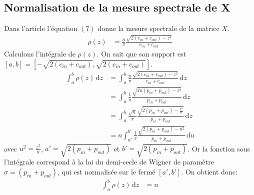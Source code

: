 \subsection{Normalisation de la mesure spectrale de X}
Dans l'article l'équation $(7)$ donne la mesure spectrale de la matrice $X$.
\begin{align*}
	\rho(z) &= \frac{n}{\pi} \frac{\sqrt{2(c_{in} + c_{out}) - z^2}}{c_{in} + c_{out}}
\end{align*}
Calculons l'intégrale de $\rho(z)$. 
On sait que son support est $[a, b] = [-\sqrt{2(c_{in} + c_{out})},\sqrt{2(c_{in} + c_{out})}]$.
\begin{align*}
	\int_{a}^{b} \rho(z) \, \mathrm{d}z &= \int_{a}^{b} \frac{n}{\pi} \frac{\sqrt{2(c_{in} + c_{out}) - z^2}}{c_{in} + c_{out}}  \, \mathrm{d}z \\
	&= \int_{a}^{b} \frac{1}{\pi} \frac{\sqrt{2 n (p_{in} + p_{out}) - z^2}}{p_{in} + p_{out}}  \, \mathrm{d}z \\
	&= \int_{a}^{b} \frac{\sqrt{n}}{\pi} \frac{\sqrt{2 (p_{in} + p_{out}) - \frac{z^2}{n}}}{p_{in} + p_{out}}  \, \mathrm{d}z  \\
	&= n \int_{a'}^{b'} \frac{1}{\pi} \frac{\sqrt{2 (p_{in} + p_{out}) - u^2}}{p_{in} + p_{out}}  \, \mathrm{d}u  
\end{align*}
avec $u^2 = \frac{z^2}{n}$, $a'= \sqrt{2(p_{in} + p_{out})}$ et $b'= \sqrt{2(p_{in} + p_{out})}$.
Or la fonction sous l’intégrale correspond à la loi du demi-cecle de Wigner de paramètre $\sigma = (p_{in} + p_{out})$, qui est normalisée sur le fermé $[a', b']$.
On obtient donc:
\begin{align*}
 	\int_{a}^{b} \rho(z) \, \mathrm{d}z &= n
\end{align*}

